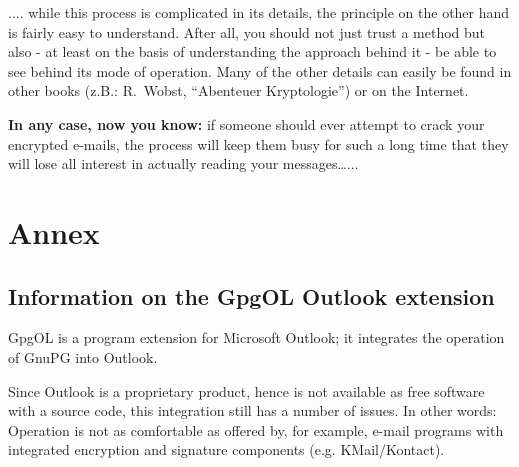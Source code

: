 \documentclass[a4paper,11pt,oneside,openright,titlepage]{scrbook}
\newcommand{\Email}{e-mail}
\begin{document}
.... while this process is complicated in its details, the principle
on the other hand is fairly easy to understand. After all, you should
not just trust a method but also - at least on the basis of
understanding the approach behind it - be able to see behind its mode
of operation. Many of the other details can easily be found in other
books (z.B.: R.~Wobst, ``Abenteuer Kryptologie'') or on the Internet.
\vfill

\textbf{In any case, now you know:} if someone should ever attempt to
crack your encrypted \Email{}s, the process will keep them busy for
such a long time that they will lose all interest in actually reading
your messages\ldots...



%


\appendix
\part{Annex}





\chapter{Information on the GpgOL Outlook extension}

\label{appendix:gpgol}

GpgOL is a program extension for Microsoft Outlook; it integrates the
operation of GnuPG into Outlook.

Since Outlook is a proprietary product, hence is not available as free
software with a source code, this integration still has a number of
issues. In other words: Operation is not as comfortable as offered by,
for example, \Email{} programs with integrated encryption and
signature components (e.g. KMail/Kontact).
\end{document}
